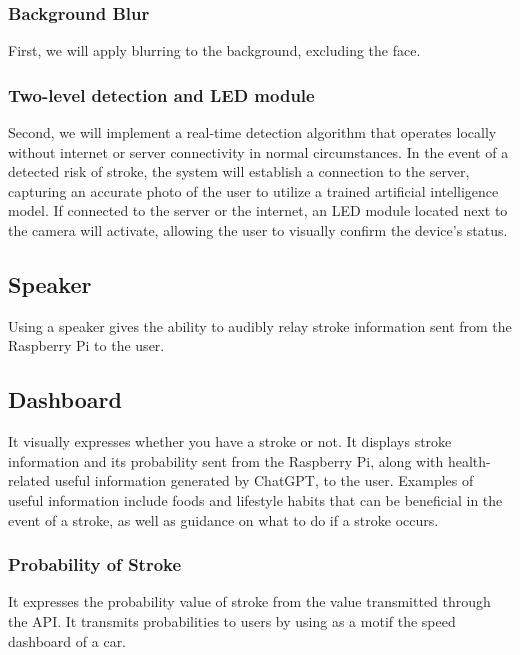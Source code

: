 \subsubsection{\textbf{Background Blur}}
First, we will apply blurring to the background, excluding the face. \\
\subsubsection{\textbf{Two-level detection and LED module}}
Second, we will implement a real-time detection algorithm that operates locally without internet or server connectivity in normal circumstances. In the event of a detected risk of stroke, the system will establish a connection to the server, capturing an accurate photo of the user to utilize a trained artificial intelligence model. If connected to the server or the internet, an LED module located next to the camera will activate, allowing the user to visually confirm the device's status.\\

\subsection{\textbf{Speaker}}

Using a speaker gives the ability to audibly relay stroke information sent from the Raspberry Pi to the user. 

\subsection{\textbf{Dashboard}}
It visually expresses whether you have a stroke or not. It displays stroke information and its probability sent from the Raspberry Pi, along with health-related useful information generated by ChatGPT, to the user. Examples of useful information include foods and lifestyle habits that can be beneficial in the event of a stroke, as well as guidance on what to do if a stroke occurs.\\
\subsubsection{\textbf{Probability of Stroke}}
It expresses the probability value of stroke from the value transmitted through the API. It transmits probabilities to users by using as a motif the speed dashboard of a car.\\
